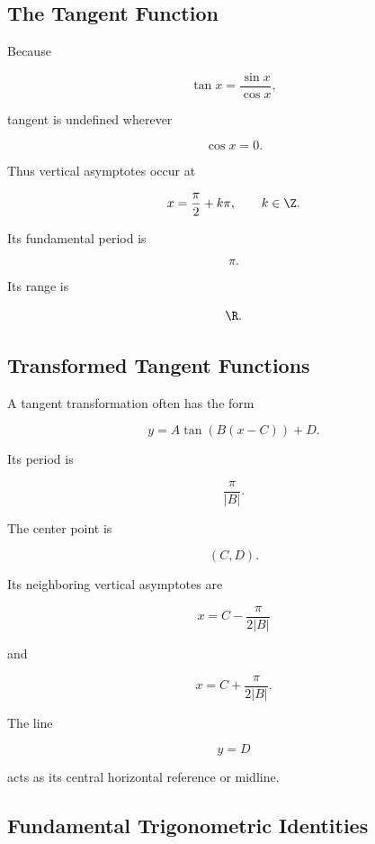 \subsection{The Tangent Function}
\label{subsec:tangent-function-analysis}

Because

\[ \tan x=\frac{\sin x}{\cos x}, \]

tangent is undefined wherever

\[ \cos x=0. \]

Thus vertical asymptotes occur at

\[ x=\frac{\pi}{2}+k\pi,\qquad k\in\Z. \]

Its fundamental period is

\[ \pi. \]

Its range is

\[ \R. \]

\subsection{Transformed Tangent Functions}
\label{subsec:transformed-tangent}

A tangent transformation often has the form

\[ y=A\tan(B(x-C))+D. \]

Its period is

\[ \frac{\pi}{|B|}. \]

The center point is

\[ (C,D). \]

Its neighboring vertical asymptotes are

\[ x=C-\frac{\pi}{2|B|} \]

and

\[ x=C+\frac{\pi}{2|B|}. \]

The line

\[ y=D \]

acts as its central horizontal reference or midline.

\subsection{Fundamental Trigonometric Identities}
\label{subsec:fundamental-trig-identities}

